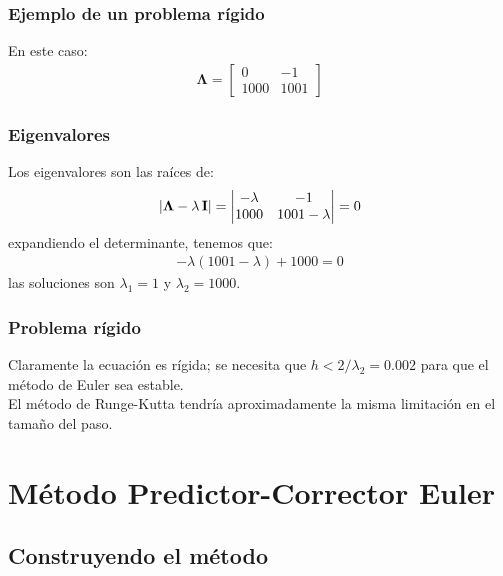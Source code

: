 \documentclass[12pt]{beamer}
\begin{document}
\begin{frame}
\frametitle{Ejemplo de un problema rígido}
En este caso:
\pause
\begin{align*}
\mathbf{\Lambda} = \begin{bmatrix}
0 & -1 \\
1000 & 1001 
\end{bmatrix}
\end{align*}
\end{frame}
\begin{frame}
\frametitle{Eigenvalores}
Los eigenvalores son las raíces de:
\pause
\begin{align*}
\abs{\mathbf{\Lambda} - \lambda \, \mathbf{I}} = \begin{vmatrix}
- \lambda & -1 \\
1000 & 1001 - \lambda
 \end{vmatrix} = 0
\end{align*}
\pause
expandiendo el determinante, tenemos que:
\pause
\begin{align*}
- \lambda (1001 - \lambda) + 1000 = 0
\end{align*}
\pause
las soluciones son $\lambda_{1} = 1$ y $\lambda_{2} = 1000$.
\end{frame}
\begin{frame}
\frametitle{Problema rígido}
Claramente la ecuación es rígida; se necesita que $h < 2/\lambda_{2} = 0.002$ para que el método de Euler sea estable.
\\
\medskip
\pause
El método de Runge-Kutta tendría aproximadamente la misma limitación en el tamaño del paso.
\end{frame}

\section{Método Predictor-Corrector Euler}
\subsection{Construyendo el método}
\end{document}
